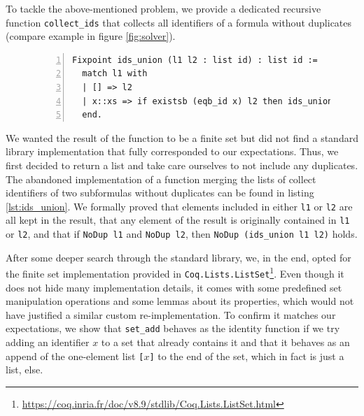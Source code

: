 To tackle the above-mentioned problem, we provide a dedicated recursive function \texttt{collect\_ids} that collects all identifiers of a formula without duplicates (compare example in figure \ref{fig:solver}).

\begin{figure}[t]
    \begin{lstlisting}[language=coq,numbers=left,numberstyle=\tiny,label=lst:ids_union,caption=Custom duplicate free list merging function.]
Fixpoint ids_union (l1 l2 : list id) : list id :=
  match l1 with
  | [] => l2
  | x::xs => if existsb (eqb_id x) l2 then ids_union xs l2 else ids_union xs (x :: l2)
  end.
    \end{lstlisting}
\end{figure}

We wanted the result of the function to be a finite set but did not find a standard library implementation that fully corresponded to our expectations.
Thus, we first decided to return a list and take care ourselves to not include any duplicates.
The abandoned implementation of a function merging the lists of collect identifiers of two subformulas without duplicates can be found in listing \ref{lst:ids_union}.
We formally proved that elements included in either \texttt{l1} or \texttt{l2} are all kept in the result, that any element of the result is originally contained in \texttt{l1} or \texttt{l2}, and that if \texttt{NoDup l1} and \texttt{NoDup l2}, then \texttt{NoDup (ids\_union l1 l2)} holds.

After some deeper search through the standard library, we, in the end, opted for the finite set implementation provided in \texttt{Coq.Lists.ListSet}\footnote{\url{https://coq.inria.fr/doc/v8.9/stdlib/Coq.Lists.ListSet.html}}.
Even though it does not hide many implementation details, it comes with some predefined set manipulation operations and some lemmas about its properties, which would not have justified a similar custom re-implementation.
To confirm it matches our expectations, we show that \texttt{set\_add} behaves as the identity function if we try adding an identifier $x$ to a set that already contains it and that it behaves as an append of the one-element list \texttt{[$x$]} to the end of the set, which in fact is just a list, else.

